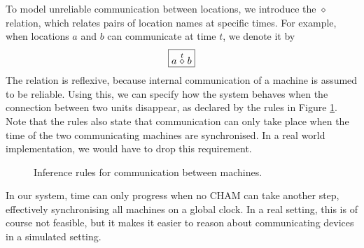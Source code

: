 
To model unreliable communication between locations, we introduce the
$\diamond$ relation, which relates pairs of location names at specific times.
For example, when locations $a$ and $b$ can
communicate at time $t$, we denote it by
\begin{equation*}
 \boxed{a \stackrel{t}{\diamond} b}
\end{equation*}
The relation is reflexive, because internal communication of a machine is
assumed to be reliable. Using this, we can specify how the system behaves when
the connection between two units disappear, as declared by the rules in Figure
\ref{fig:rule:coms}. Note that the rules also state that communication can only
take place when the time of the two communicating machines are synchronised. In
a real world implementation, we would have to drop this requirement.
\begin{figure}[!h]
\caption{Inference rules for communication between machines.}\label{fig:rule:coms}
\end{figure}

In our system, time can only progress when no CHAM can take another step,
effectively synchronising all machines on a global clock. In a real setting,
this is of course not feasible, but it makes it easier to reason about
communicating devices in a simulated setting.

